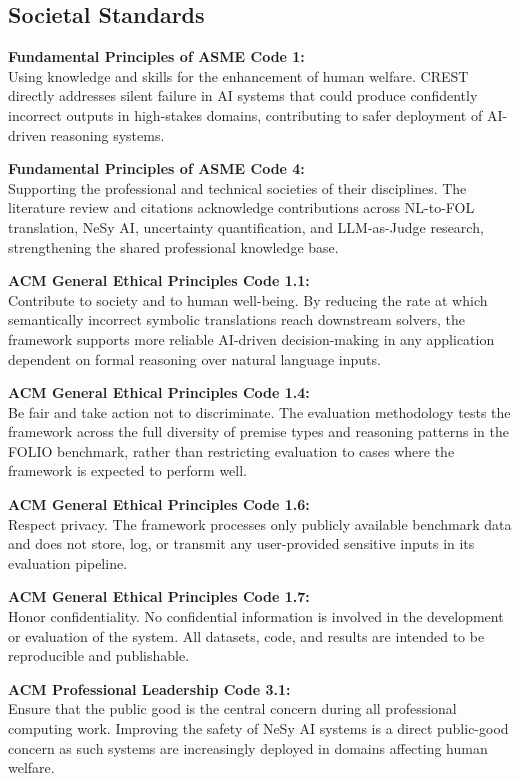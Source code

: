 \subsection{Societal Standards}

\textbf{Fundamental Principles of ASME Code 1:}\\
Using knowledge and skills for the enhancement of human welfare. CREST directly addresses silent failure in AI systems that could produce confidently incorrect outputs in high-stakes domains, contributing to safer deployment of AI-driven reasoning systems.

\textbf{Fundamental Principles of ASME Code 4:}\\
Supporting the professional and technical societies of their disciplines. The literature review and citations acknowledge contributions across NL-to-FOL translation, NeSy AI, uncertainty quantification, and LLM-as-Judge research, strengthening the shared professional knowledge base.

\textbf{ACM General Ethical Principles Code 1.1:}\\
Contribute to society and to human well-being. By reducing the rate at which semantically incorrect symbolic translations reach downstream solvers, the framework supports more reliable AI-driven decision-making in any application dependent on formal reasoning over natural language inputs.

\textbf{ACM General Ethical Principles Code 1.4:}\\
Be fair and take action not to discriminate. The evaluation methodology tests the framework across the full diversity of premise types and reasoning patterns in the FOLIO benchmark, rather than restricting evaluation to cases where the framework is expected to perform well.

\textbf{ACM General Ethical Principles Code 1.6:}\\
Respect privacy. The framework processes only publicly available benchmark data and does not store, log, or transmit any user-provided sensitive inputs in its evaluation pipeline.

\textbf{ACM General Ethical Principles Code 1.7:}\\
Honor confidentiality. No confidential information is involved in the development or evaluation of the system. All datasets, code, and results are intended to be reproducible and publishable.

\textbf{ACM Professional Leadership Code 3.1:}\\
Ensure that the public good is the central concern during all professional computing work. Improving the safety of NeSy AI systems is a direct public-good concern as such systems are increasingly deployed in domains affecting human welfare.

